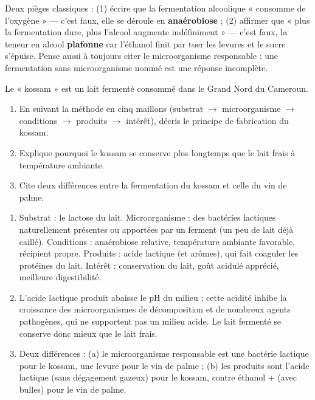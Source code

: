 \documentclass[11pt]{article}
\begin{document}
\begin{attention}
Deux pièges classiques : (1) écrire que la fermentation alcoolique « consomme de l'oxygène » — c'est faux, elle se déroule en \textbf{anaérobiose} ; (2) affirmer que « plus la fermentation dure, plus l'alcool augmente indéfiniment » — c'est faux, la teneur en alcool \textbf{plafonne} car l'éthanol finit par tuer les levures et le sucre s'épuise. Pense aussi à toujours citer le microorganisme responsable : une fermentation sans microorganisme nommé est une réponse incomplète.
\end{attention}

\begin{exercice}
Le « kossam » est un lait fermenté consommé dans le Grand Nord du Cameroun.
\begin{enumerate}
\item En suivant la méthode en cinq maillons (substrat $\rightarrow$ microorganisme $\rightarrow$ conditions $\rightarrow$ produits $\rightarrow$ intérêt), décris le principe de fabrication du kossam.
\item Explique pourquoi le kossam se conserve plus longtemps que le lait frais à température ambiante.
\item Cite deux différences entre la fermentation du kossam et celle du vin de palme.
\end{enumerate}
\end{exercice}

\begin{corrige}
\begin{enumerate}
\item Substrat : le lactose du lait. Microorganisme : des bactéries lactiques naturellement présentes ou apportées par un ferment (un peu de lait déjà caillé). Conditions : anaérobiose relative, température ambiante favorable, récipient propre. Produits : acide lactique (et arômes), qui fait coaguler les protéines du lait. Intérêt : conservation du lait, goût acidulé apprécié, meilleure digestibilité.
\item L'acide lactique produit abaisse le pH du milieu ; cette acidité inhibe la croissance des microorganismes de décomposition et de nombreux agents pathogènes, qui ne supportent pas un milieu acide. Le lait fermenté se conserve donc mieux que le lait frais.
\item Deux différences : (a) le microorganisme responsable est une bactérie lactique pour le kossam, une levure pour le vin de palme ; (b) les produits sont l'acide lactique (sans dégagement gazeux) pour le kossam, contre éthanol +  (avec bulles) pour le vin de palme.
\end{enumerate}
\end{corrige}
\end{document}
